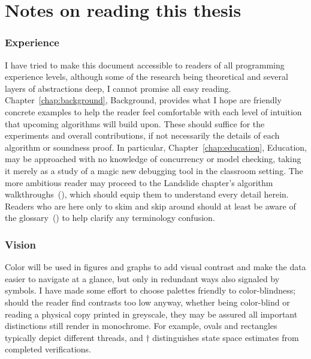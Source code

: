 \section{Notes on reading this thesis}

\subsubsection{Experience}

I have tried to make this document accessible to readers of all programming experience levels,
although some of the research being theoretical and several layers of abstractions deep,
I cannot promise all easy reading.
Chapter~\ref{chap:background}, Background, provides what I hope are friendly concrete examples
to help the reader feel comfortable with each level of intuition that upcoming algorithms will build upon.
These should suffice for the experiments and overall contributions,
if not necessarily the details of each algorithm or soundness proof.
In particular, Chapter~\ref{chap:education}, Education,
may be approached with no knowledge of concurrency or model checking,
taking it merely as a study of a magic new debugging tool in the classroom setting.
The more ambitious reader may proceed to the Landslide chapter's algorithm walkthroughs~(\sect{\ref{sec:landslide-algs}}),
which should equip them to understand every detail herein.
Readers who are here only to skim and skip around should at least be aware of the glossary~(\sect{\ref{sec:glossary}})
to help clarify any terminology confusion.

\subsubsection{Vision}

Color will be used in figures and graphs to add visual contrast and make the data easier to navigate at a glance,
but only in redundant ways also signaled by symbols.
I have made some effort to choose palettes friendly to color-blindness;
should the reader find contrasts too low anyway,
whether being color-blind or reading a physical copy printed in greyscale,
they may be assured all important distinctions still render in monochrome.
For example, ovals and rectangles typically depict different threads,
and $\dagger$ distinguishes state space estimates from completed verifications.


